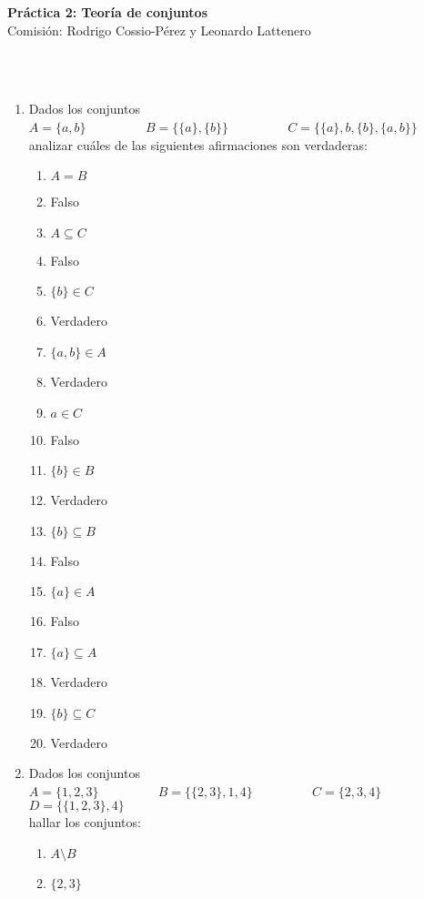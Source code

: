 \documentclass[a4paper]{article}
\newcommand{\answer}{\item[**]}
\newcommand{\exercise}{\item}
\begin{document}
\noindent \hrulefill 
\vspace{-7pt}
\begin{center} 
	\textbf{ Práctica 2: Teoría de conjuntos} \\
	Comisión: Rodrigo Cossio-Pérez y Leonardo Lattenero
\end{center}
\vspace{-10pt}
\hrulefill \\
\phantom{~} \\

\begin{enumerate}

	\exercise Dados los conjuntos \\ $A=\{a,b\}$ ~~~~~~~~ $B=\{ \{a\}, \{b\} \}$ ~~~~~~~~ $C=\{ \{a\}, b, \{b\}, \{a,b\} \}$ \\ analizar cuáles de las siguientes afirmaciones son verdaderas:
	\begin{multicols}{3}
	\begin{enumerate} [label=(\alph*)]
		\item $A=B$
		\answer Falso

		\item $A \subseteq C$
		\answer Falso

		\item $\{b\} \in C$
		\answer Verdadero

		\item $\{a,b\} \in A$
		\answer Verdadero

		\item $a \in C$
		\answer Falso

		\item $\{b\} \in B$
		\answer Verdadero

		\item $\{b\} \subseteq B$
		\answer Falso

		\item $\{a\} \in A$
		\answer Falso

		\item $\{a\} \subseteq A$
		\answer Verdadero

		\item $\{b\} \subseteq C$
		\answer Verdadero

	\end{enumerate}
	\end{multicols}

	\exercise Dados los conjuntos \\ $A=\{1,2,3\}$ ~~~~~~~~ $B=\{ \{2,3\}, 1, 4\}$ ~~~~~~~~ $C=\{ 2,3,4 \}$ ~~~~~~~~ $D=\{ \{1,2,3\} ,4 \}$ \\ hallar los conjuntos: 
	\begin{multicols}{3}
	\begin{enumerate} [label=(\alph*)]
		\item $A\setminus B$
		\answer $\{2,3\}$


\end{enumerate}
\end{multicols}
\end{enumerate}
\end{document}

